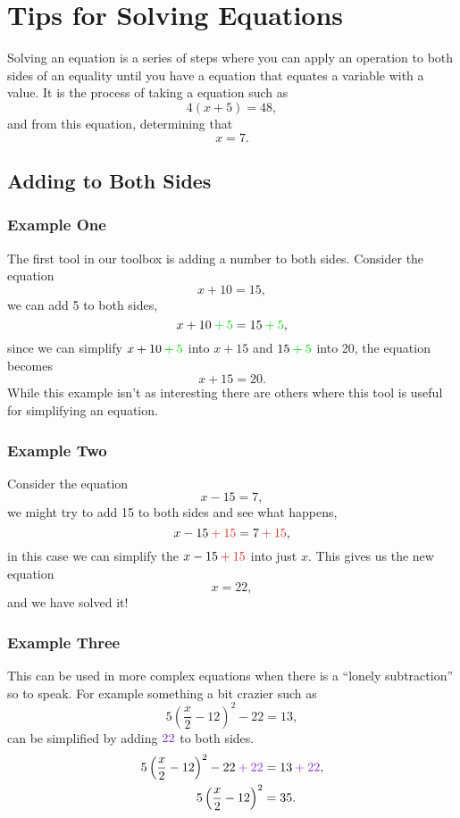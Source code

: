 \documentclass[a4paper,12pt]{article}
\begin{document}
\section*{Tips for Solving Equations}
Solving an equation is a series of steps where you can apply an
operation to both sides of an equality until you have a 
equation that equates a variable with a value. It is the process
of taking a equation such as
$$4(x + 5) = 48,$$
and from this equation, determining that
$$x = 7.$$

\subsection*{Adding to Both Sides}

\subsubsection*{Example One}

The first tool in our toolbox is adding a number to both sides.
Consider the equation
$$x + 10 = 15,$$
we can add {\color{Green3}5} to both sides,
$$x + 10 \color{Green3} + 5\color{black} = 15 \color{Green3} + 5 \color{black},$$
since we can simplify $x + 10 \color{Green3} + 5$ into $x + 15$ and 
$15 \color{Green3} + 5$ into 20, the equation becomes
$$x + 15 = 20.$$
While this example isn't as interesting there are others where
this tool is useful for simplifying an equation. 

\subsubsection*{Example Two}

Consider the equation
$$x - 15 = 7,$$
we might try to add {\color{Firebrick3}15} to both sides and see
what happens,
$$x - 15 \color{Firebrick3} + 15 \color{black} = 7 \color{Firebrick3} + 15\color{black},$$
in this case we can simplify the $x - 15 \color{Firebrick3}+ 15$
into just $x$. This gives us the new equation
$$x = 22,$$
and we have solved it!

\subsubsection*{Example Three}

This can be used in more complex equations when there is a 
``lonely subtraction'' so to speak. For example something a bit
crazier such as
$$5\left(\frac{x}{2}-12\right)^2 - 22 = 13,$$
can be simplified by adding $\color{Purple3}22$ to both sides.
\begin{align*}
5\left(\frac{x}{2}-12\right)^2 - 22 \color{Purple3} + 22\color{black} &= 13\color{Purple3} + 22\color{black}, \\
5\left(\frac{x}{2}-12\right)^2 &= 35.
\end{align*}
\end{document}
